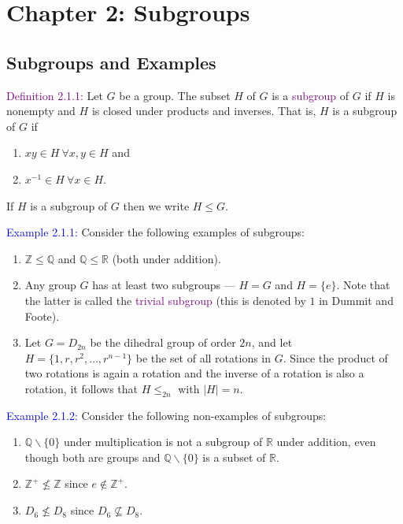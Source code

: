 \documentclass{article}
\begin{document}
\newpage 
\section{Chapter 2: Subgroups}
\subsection{Subgroups and Examples}
\textcolor{purple}{Definition 2.1.1:} Let $G$ be a group. The subset $H$ of $G$ is a \textcolor{purple}{subgroup} of $G$ if $H$ is 
nonempty and $H$ is closed under products and inverses. That is, $H$ is a subgroup of $G$ if
\begin{enumerate}
    \item $xy \in H \ \forall x,y \in H$ and 
    \item $x^{-1} \in H \ \forall x \in H$.
\end{enumerate}
If $H$ is a subgroup of $G$ then we write $H \leq G$.

\textcolor{blue}{Example 2.1.1:} Consider the following examples of subgroups:
\begin{enumerate}
    \item $\mathbb{Z} \leq \mathbb{Q}$ and $\mathbb{Q} \leq \mathbb{R}$ (both under addition).
    \item Any group $G$ has at least two subgroups --- $H = G$ and $H = \{e\}$. Note that the latter is called the 
    \textcolor{purple}{trivial subgroup} (this is denoted by $1$ in Dummit and Foote).
    \item Let $G = D_{2n}$ be the dihedral group of order $2n$, and let $H = \{1,r,r^2, \dots, r^{n-1}\}$ be the set of all rotations in 
    $G$. Since the product of two rotations is again a rotation and the inverse of a rotation is also a rotation, it follows that 
    $H \leq _{2n}$ with $|H| = n$.
\end{enumerate}

\textcolor{blue}{Example 2.1.2:} Consider the following non-examples of subgroups:
\begin{enumerate}
    \item $\mathbb{Q} \backslash \{0\}$ under multiplication is not a subgroup of $\mathbb{R}$ under addition, even though both are 
    groups and $\mathbb{Q} \backslash \{0\}$ is a subset of $\mathbb{R}$.
    \item $\mathbb{Z}^+ \nleq \mathbb{Z}$ since $e \notin \mathbb{Z}^+$.
    \item $D_6 \nleq D_8$ since $D_6 \nsubseteq D_8$.
\end{enumerate}
\end{document}
